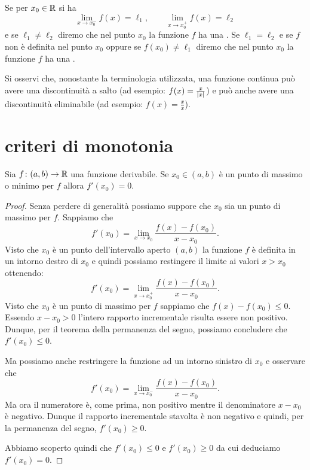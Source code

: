 \begin{definition}
Se per $x_0\in \mathbb R$ si ha 
\[
  \lim_{x\to x_0^-} f(x) = \ell_1, 
  \qquad 
  \lim_{x\to x_0^+} f(x) = \ell_2
\]
e se $\ell_1\neq \ell_2$ diremo che nel punto $x_0$ 
la funzione $f$ ha una .
Se $\ell_1=\ell_2$ e se $f$ non è definita nel punto $x_0$ 
oppure se $f(x_0)\neq \ell_1$ diremo che 
nel punto $x_0$ la funzione $f$ 
ha una .
\end{definition}

Si osservi che, nonostante la terminologia utilizzata,
una funzione continua può avere una discontinuità 
a salto (ad esempio: $f(x)=\frac{x}{{\left|x\right|}}$) 
e può anche avere una discontinuità eliminabile
(ad esempio: $f(x) = \frac{x}{x}$).

\section{criteri di monotonia}

\begin{theorem}[Fermat]
\mymark{***}
Sia $f\colon (a,b)\to \mathbb R$ una funzione derivabile.
Se $x_0\in (a,b)$ è un punto di massimo o minimo per $f$ allora
$f'(x_0)=0$.
\end{theorem}
%
\begin{proof}
\mymark{***}
Senza perdere di generalità possiamo suppore che $x_0$ sia un punto di massimo per $f$.
Sappiamo che
\[
  f'(x_0) = \lim_{x\to x_0}\frac{f(x)-f(x_0)}{x-x_0}.
\]
Visto che $x_0$ è un punto dell'intervallo aperto $(a,b)$ la funzione $f$ è definita in un intorno destro di $x_0$ e quindi possiamo restingere il limite ai valori $x>x_0$ ottenendo:
\[
  f'(x_0) = \lim_{x\to x_0^+}\frac{f(x) - f(x_0)}{x-x_0}.
\]
Visto che $x_0$ è un punto di massimo per $f$ sappiamo che $f(x)-f(x_0)\le 0$. Essendo $x-x_0>0$ l'intero rapporto incrementale risulta essere non positivo.
Dunque, per il teorema della permanenza del segno,
possiamo concludere che $f'(x_0)\le 0$.

Ma possiamo anche restringere la funzione ad un intorno sinistro di $x_0$ e osservare che
\[
  f'(x_0) = \lim_{x\to x_0^-}\frac{f(x)-f(x_0)}{x-x_0}.
\]
Ma ora il numeratore è, come prima, non positivo mentre il denominatore $x-x_0$ è negativo. Dunque il rapporto incrementale stavolta è non negativo e quindi, per la permanenza del segno, $f'(x_0) \ge 0$.

Abbiamo scoperto quindi che $f'(x_0)\le 0$ e $f'(x_0)\ge 0$
da cui deduciamo $f'(x_0)=0$.
\end{proof}

